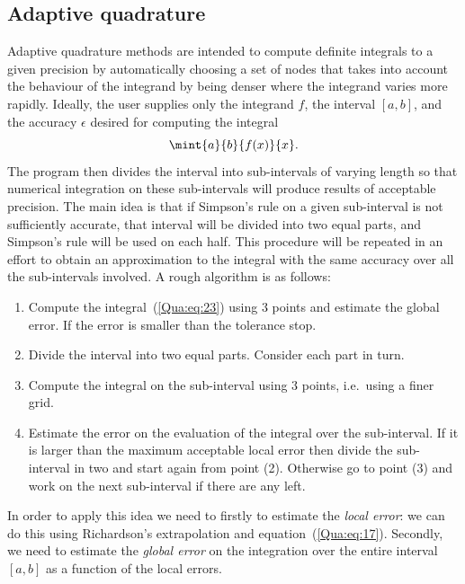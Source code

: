 \subsection{Adaptive quadrature}

Adaptive quadrature methods are intended to compute definite integrals
to a given precision by automatically choosing a set of nodes that
takes into account the behaviour of the integrand by being denser
where the integrand varies more rapidly. Ideally, the user supplies
only the integrand $f$, the interval $[a,b]$, and the accuracy
$\epsilon$ desired for computing the integral
%
\begin{equation}
  \mint{a}{b}{f(x)}{x} . \label{Qua:eq:23}
\end{equation}
%
The program then divides the interval into sub-intervals of varying
length so that numerical integration on these sub-intervals will
produce results of acceptable precision. The main idea is that if
Simpson's rule on a given sub-interval is not sufficiently accurate,
that interval will be divided into two equal parts, and Simpson's rule
will be used on each half. This procedure will be repeated in an
effort to obtain an approximation to the integral with the same
accuracy over all the sub-intervals involved.  A rough algorithm is as
follows:

\begin{enumerate}
\item Compute the integral~(\ref{Qua:eq:23}) using $3$ points and
  estimate the global error.  If the error is smaller than the
  tolerance stop.
\item Divide the interval into two equal parts.  Consider each part in
  turn.
\item Compute the integral on the sub-interval using $3$ points,
  i.e.\ using a finer grid.
%
\item Estimate the error on the evaluation of the integral over the
  sub-interval.  If it is larger than the maximum acceptable local
  error then divide the sub-interval in two and start again from point
  (2).  Otherwise go to point (3) and work on the next sub-interval if
  there are any left.
%
\end{enumerate}

In order to apply this idea we need to firstly to estimate the
\textit{local error}: we can do this using Richardson's extrapolation
and equation~(\ref{Qua:eq:17}).  Secondly, we need to estimate the
\textit{global error} on the integration over the entire interval
$[a,b]$ as a function of the local errors.

